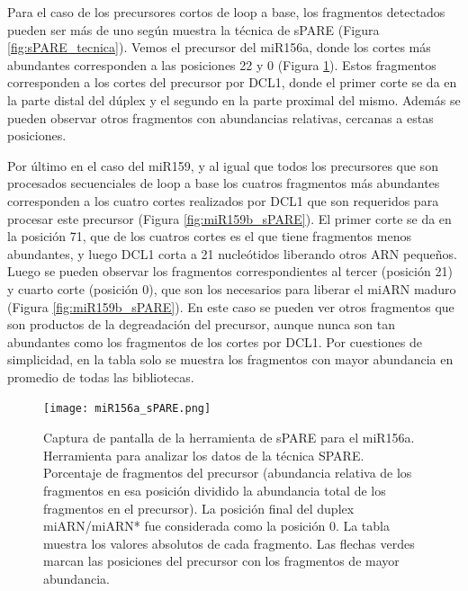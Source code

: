 Para el caso de los precursores cortos de loop a base, los fragmentos detectados pueden ser más de uno según muestra la técnica de sPARE (Figura \ref{fig:sPARE_tecnica}).
Vemos el precursor del miR156a, donde los cortes más abundantes corresponden a las posiciones 22 y 0 (Figura \ref{fig:miR156a_sPARE}).
Estos fragmentos corresponden a los cortes del precursor por DCL1, donde el primer corte se da en la parte distal del dúplex y el segundo en la parte proximal del mismo.
Además se pueden observar otros fragmentos con abundancias relativas, cercanas a estas posiciones. 


Por último en el caso del miR159, y al igual que todos los precursores que son procesados secuenciales de loop a base los cuatros fragmentos más abundantes corresponden a los cuatro cortes realizados por DCL1 que son requeridos para procesar este precursor (Figura \ref{fig:miR159b_sPARE}).
El primer corte se da en la posición 71, que de los cuatros cortes es el que tiene fragmentos menos abundantes, y luego DCL1 corta a 21 nucleótidos liberando otros ARN pequeños.
Luego se pueden observar los fragmentos correspondientes al tercer (posición 21) y cuarto corte (posición 0), que son los necesarios para liberar el miARN maduro (Figura \ref{fig:miR159b_sPARE}).
En este caso se pueden ver otros fragmentos que son productos de la degreadación del precursor, aunque nunca son tan abundantes como los fragmentos de los cortes por DCL1.
Por cuestiones de simplicidad, en la tabla solo se muestra los fragmentos con mayor abundancia en promedio de todas las bibliotecas.


\begin{landscape}
    \begin{figure}[htbp!] 
        \centering    
        \texttt{[image: miR156a\_sPARE.png]}
        \caption[Captura de pantalla de la herramienta de sPARE para el miR156a]{Captura de pantalla de la herramienta de sPARE para el miR156a.
        Herramienta para analizar los datos de la técnica SPARE.
        Porcentaje de fragmentos del precursor (abundancia relativa de los fragmentos en esa posición dividido la abundancia total de los fragmentos en el precursor).
        La posición final del duplex miARN/miARN* fue considerada como la posición 0.
        La tabla muestra los valores absolutos de cada fragmento.
        Las flechas verdes marcan las posiciones del precursor con los fragmentos de mayor abundancia. 
        }
         \label{fig:miR156a_sPARE}
    \end{figure}
\end{landscape}



